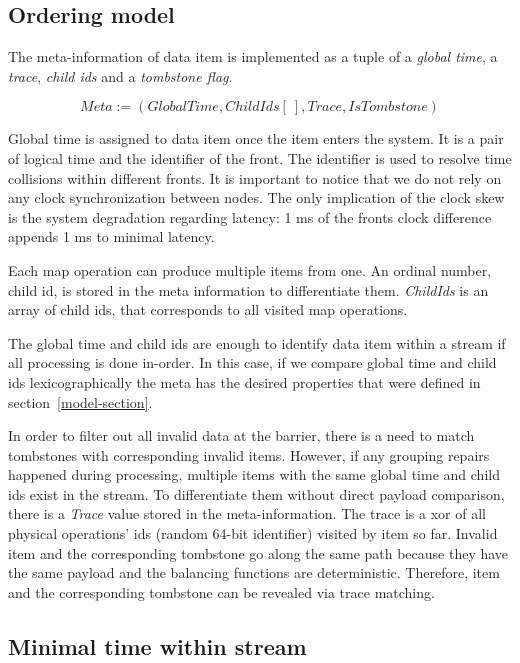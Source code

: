 \subsection{Ordering model}
The meta-information of data item is implemented as a tuple of a {\it global time}, a {\it trace}, {\it child ids} and a {\it tombstone flag}.

\[Meta := (GlobalTime, ChildIds[\:], Trace, IsTombstone)\]

Global time is assigned to data item once the item enters the system. It is a pair of logical time and the identifier of the front. The identifier is used to resolve time collisions within different fronts. It is important to notice that we do not rely on any clock synchronization between nodes. The only implication of the clock skew is the system degradation regarding latency: 1 ms of the fronts clock difference appends 1 ms to minimal latency.

Each map operation can produce multiple items from one.  An ordinal number, child id, is stored in the meta information to differentiate them. {\it ChildIds} is an array of child ids, that corresponds to all visited map operations.

The global time and child ids are enough to identify data item within a stream if all processing is done in-order. In this case, if we compare global time and child ids lexicographically the meta has the desired properties that were defined in section~\ref{model-section}. 

In order to filter out all invalid data at the barrier, there is a need to match tombstones with corresponding invalid items. However, if any grouping repairs happened during processing, multiple items with the same global time and child ids exist in the stream. To differentiate them without direct payload comparison, there is a {\it Trace} value stored in the meta-information. The trace is a xor of all physical operations' ids (random 64-bit identifier) visited by item so far. Invalid item and the corresponding tombstone go along the same path because they have the same payload and the balancing functions are deterministic. Therefore, item and the corresponding tombstone can be revealed via trace matching. 

\label{mininal-time}

\subsection{Minimal time within stream}

